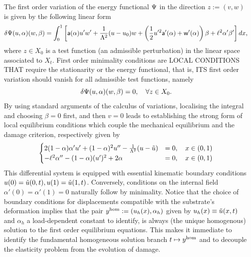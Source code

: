The first order variation of the energy functional $\Psi$ in the direction $z:=(v, w)$ is given by the following linear form  
\begin{equation}
    \delta \Psi(u,\alpha)(w,\beta)=\int_0^1
\left[\mathsf{a}(\alpha)u'w'+\frac{1}{\Lambda^2} (u-u_0) w+ \left( \frac{1}{2}u'^2 \mathsf{a}'(\alpha)+\mathsf{w}'(\alpha) \right)\beta+\ell^2\alpha'\beta' \right]dx,\label{firstvar1}
\end{equation}
where 
$z\in X_0$ is a test function (an admissible perturbation) in the linear space associated to $X_t$. First order minimality conditions are LOCAL CONDITIONS THAT require the stationarity or the energy functional, that is, ITS first order variation should vanish for all admissible test functions, namely
\begin{equation}
    \label{eq:stationarity}
    \delta \Psi(u,\alpha)(w,\beta)=0, \quad \forall z\in X_0.
\end{equation}
By using standard arguments of the calculus of variations, localising the integral and choosing $\beta = 0$ first, and then $v =0$ leads to establishing the strong form of local equilibrium conditions which couple the mechanical equilibrium and the damage criterion, respectively given by
\begin{eqnarray}
\begin{cases}
  2(1-\alpha)\alpha' u' +(1-\alpha)^2 u'' -  \frac{1}{\Lambda^2}(u-\tilde u) &= 0, \quad {x\in (0, 1)}\\
  -\ell^2\alpha'' - (1-\alpha)( u')^2 + 2\alpha   &= 0, \quad {x\in (0, 1)}
\end{cases}
\label{auto1}
\end{eqnarray}
This differential system is equipped with essential kinematic boundary conditions $u(0) = \tilde u(0, t), u(1) = \tilde u(1, t)$. Conversely, conditions on the internal field $\alpha'(0)=\alpha'(1)=0$ naturally follow by minimality.
Notice that the choice of boundary conditions for displacements compatible with the substrate's deformation implies that the pair $y^{\text{hom}}:=(u_h(x), \alpha_h)$ given by $u_h(x)\equiv \tilde u(x, t)$ and $\alpha_h$ a load-dependent constant to identify, is always (the unique homogenous) solution to the first order equilibrium equations. This makes it immediate to identify the fundamental homogeneous solution branch $t \mapsto y^{\text{hom}}$ and to decouple the elasticity problem from the  evolution of damage. 

